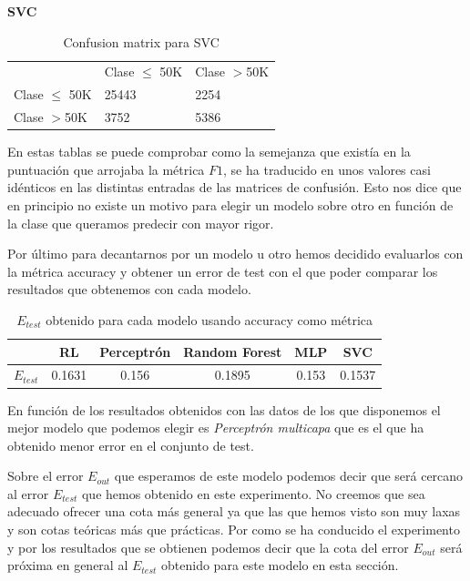 \documentclass[11pt]{article}
\begin{document}
\textbf{SVC}
\begin{table}[H]
\centering
\begin{tabular}{lll}
                          &          Clase $\leq$ 50K        &       Clase $>$50K                \\ \cline{2-3} 
\multicolumn{1}{l|}{Clase $\leq$ 50K} & \multicolumn{1}{l|}{25443} & \multicolumn{1}{l|}{2254} \\ \cline{2-3} 
\multicolumn{1}{l|}{Clase $>$50K } & \multicolumn{1}{l|}{3752} & \multicolumn{1}{l|}{5386} \\ \cline{2-3} 
\end{tabular}
\caption{Confusion matrix para SVC}
\end{table}

En estas tablas se puede comprobar como la semejanza que existía en la
puntuación que arrojaba la métrica $F1$, se ha traducido en unos valores casi
idénticos en las distintas entradas de las matrices de confusión. Esto nos dice
que en principio no existe un motivo para elegir un modelo sobre otro en función
de la clase que queramos predecir con mayor rigor. 

Por último para decantarnos por un modelo u otro hemos decidido evaluarlos con
la métrica accuracy y obtener un error de test con el que poder comparar los
resultados que obtenemos con cada modelo.

\begin{table}[H]
    \centering
    \begin{tabular}{c|c|c|c|c|c|}
    \cline{2-6}
                           & RL & Perceptrón & Random Forest & MLP & SVC \\ \hline
    \multicolumn{1}{|l|}{$E_{test}$}  & 0.1631 & 0.156 & 0.1895  & 0.153  & 0.1537  \\ \hline
    \end{tabular}
    \caption{$E_{test}$ obtenido para cada modelo usando accuracy como métrica}
\end{table}

En función de los resultados obtenidos con las datos de los que disponemos el
mejor modelo que podemos elegir es \textit{Perceptrón multicapa} que es el que
ha obtenido menor error en el conjunto de test.

Sobre el error $E_{out}$ que esperamos de este modelo podemos decir que será
cercano al error $E_{test}$ que hemos obtenido en este experimento. No creemos
que sea adecuado ofrecer una cota más general ya que las que hemos visto son muy
laxas y son cotas teóricas más que prácticas. Por como se ha conducido el
experimento y por los resultados que se obtienen podemos decir que la cota del 
error $E_{out}$ será próxima en general al $E_{test}$ obtenido para este modelo
en esta sección.
\end{document}
